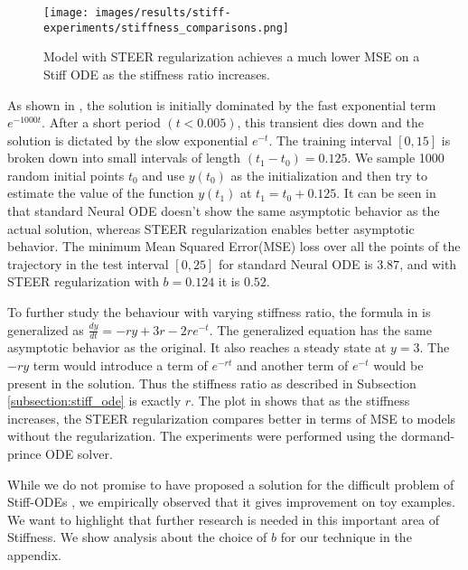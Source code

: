 \begin{wrapfigure}[18]{r}{0.55\textwidth}
	\vspace{-0.3in} 
	\centering
	\texttt{[image: images/results/stiff-experiments/stiffness\_comparisons.png]}
	\caption{Model with STEER regularization achieves a much lower MSE on a Stiff ODE as the stiffness ratio increases.} 
	\label{fig:stiffness_comparisons}
\end{wrapfigure}

As shown in , the solution is initially dominated by the fast exponential term $e^{-1000t}$. After a short period $(t<0.005)$, this transient dies down and the solution is dictated by the slow exponential $e^{-t}$. 
The training interval $[0,15]$ is broken down into small intervals of length $(t_1-t_0)=0.125$. We sample 1000 random initial points $t_0$ and use $y(t_0)$ as the initialization and then try to estimate the value of the function $y(t_1)$ at $t_1=t_0+0.125$.
It can be seen in  that standard Neural ODE doesn't show the same asymptotic behavior as the actual solution, whereas STEER regularization enables better asymptotic behavior. The minimum Mean Squared Error(MSE) loss over all the points of the trajectory in the test interval $[0,25]$ for standard Neural ODE is $3.87$, and with STEER regularization with $b=0.124$ it is $0.52$. 


To further study the behaviour with varying stiffness ratio, the formula in  is generalized as $\frac{dy}{dt}= -ry + 3r - 2re^{-t}$. The generalized equation has the same asymptotic behavior as the original. It also reaches a steady state at $y=3$. The $-ry$ term would introduce a term of $e^{-rt}$ and another term of $e^{-t}$ would be present in the solution. Thus the stiffness ratio as described in Subsection \ref{subsection:stiff_ode} is exactly $r$. The plot in  shows that as the stiffness increases, the STEER regularization compares better in terms of MSE to models without the regularization. The experiments were performed using the dormand-prince \cite{dormand1980family} ODE solver.

While we do not promise to have proposed a solution for the difficult problem of Stiff-ODEs \cite{chapra2010numerical}, we empirically observed that it gives improvement on toy examples. We want to highlight that further research is needed in this important area of Stiffness.
We show analysis about the choice of $b$ for our technique in the appendix.



